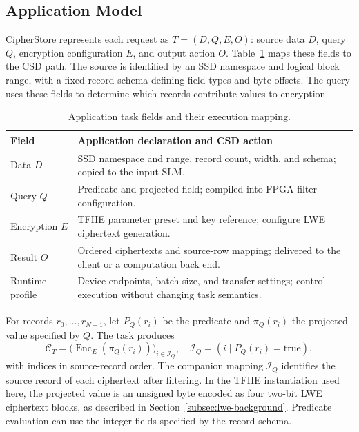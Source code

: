 \subsection{Application Model}
\label{subsec:task-model}

CipherStore represents each request as $T=(D,Q,E,O)$: source data $D$, query $Q$, encryption configuration $E$, and output action $O$. Table~\ref{tab:cipherstore-task} maps these fields to the CSD path. The source is identified by an SSD namespace and logical block range, with a fixed-record schema defining field types and byte offsets. The query uses these fields to determine which records contribute values to encryption.

\begin{table}[H]
  \centering
  \small
  \setlength{\tabcolsep}{4pt}
  \caption{Application task fields and their execution mapping.}
  \label{tab:cipherstore-task}
  \begin{tabular}{@{}p{}p{}@{}}
    \toprule
    Field & Application declaration and CSD action \\
    \midrule
    Data $D$ & SSD namespace and range, record count, width, and schema; copied to the input SLM. \\
    Query $Q$ & Predicate and projected field; compiled into FPGA filter configuration. \\
    Encryption $E$ & TFHE parameter preset and key reference; configure LWE ciphertext generation. \\
    Result $O$ & Ordered ciphertexts and source-row mapping; delivered to the client or a computation back end. \\
    \midrule
    Runtime profile & Device endpoints, batch size, and transfer settings; control execution without changing task semantics. \\
    \bottomrule
  \end{tabular}
\end{table}

For records $r_0,\ldots,r_{N-1}$, let $P_Q(r_i)$ be the predicate and $\pi_Q(r_i)$ the projected value specified by $Q$. The task produces
\begin{equation}
\mathcal{C}_T=
\bigl(\operatorname{Enc}_{E}(\pi_Q(r_i))\bigr)_{i\in\mathcal{I}_Q},
\quad
\mathcal{I}_Q=(i\mid P_Q(r_i)=\mathrm{true}),
\label{eq:ciphertext-generation-task}
\end{equation}
with indices in source-record order. The companion mapping $\mathcal{I}_Q$ identifies the source record of each ciphertext after filtering. In the TFHE instantiation used here, the projected value is an unsigned byte encoded as four two-bit LWE ciphertext blocks, as described in Section~\ref{subsec:lwe-background}. Predicate evaluation can use the integer fields specified by the record schema.

